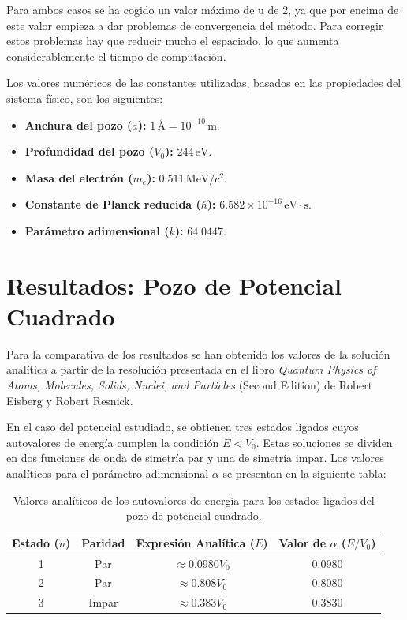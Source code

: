 \documentclass[11pt,a4paper]{article}
\begin{document}
Para ambos casos se ha cogido un valor máximo de u de 2, ya que por encima de este valor empieza a dar problemas de convergencia del método. Para corregir estos problemas hay que reducir mucho el espaciado, lo que aumenta considerablemente el tiempo de computación.

Los valores numéricos de las constantes utilizadas, basados en las propiedades del sistema físico, son los siguientes:

\begin{itemize}
    \item \textbf{Anchura del pozo ($a$):} $1\,\text{\AA} = 10^{-10}\,\text{m}$.
    \item \textbf{Profundidad del pozo ($V_0$):} $244\,\text{eV}$.
    \item \textbf{Masa del electrón ($m_e$):} $0.511\,\text{MeV}/c^2$.
    \item \textbf{Constante de Planck reducida ($\hbar$):} $6.582 \times 10^{-16}\,\text{eV}\cdot\text{s}$.
    \item \textbf{Parámetro adimensional ($k$):} $64.0447$.
\end{itemize}

\section{Resultados: Pozo de Potencial Cuadrado}

Para la comparativa de los resultados se han obtenido los valores de la solución analítica a partir de la resolución presentada en el libro \textit{Quantum Physics of Atoms, Molecules, Solids, Nuclei, and Particles} (Second Edition) de Robert Eisberg y Robert Resnick.

En el caso del potencial estudiado, se obtienen tres estados ligados cuyos autovalores de energía cumplen la condición $E < V_0$. Estas soluciones se dividen en dos funciones de onda de simetría par y una de simetría impar. Los valores analíticos para el parámetro adimensional $\alpha$ se presentan en la siguiente tabla:

\begin{table}[h]
\centering
\begin{tabular}{c c c c}
\toprule
Estado ($n$) & Paridad & Expresión Analítica ($E$) & Valor de $\alpha$ ($E/V_0$) \\
\midrule
1 & Par & $\approx 0.0980 V_0$ & 0.0980 \\
2 & Par & $\approx 0.808 V_0$ & 0.8080 \\
3 & Impar & $\approx 0.383 V_0$ & 0.3830 \\
\bottomrule
\end{tabular}
\caption{Valores analíticos de los autovalores de energía para los estados ligados del pozo de potencial cuadrado.}
\end{table}
\end{document}
